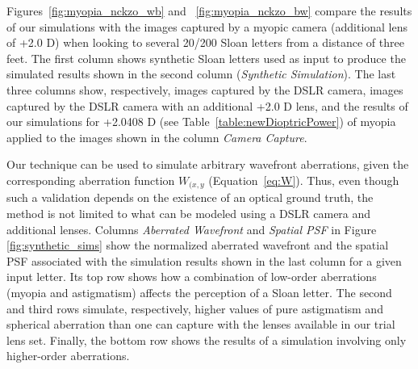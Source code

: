 Figures~\ref{fig:myopia_nckzo_wb} and ~\ref{fig:myopia_nckzo_bw} compare the results of our simulations with the images captured by a myopic camera (additional lens of +2.0 D) when looking to several 20/200 Sloan letters from a distance of three feet. 
The first column shows synthetic Sloan letters used as input to produce the simulated results shown in the second column ({\it Synthetic Simulation}). 
The last three columns show, respectively, images captured by the DSLR camera, images captured by the DSLR camera with an additional +2.0 D lens, and the results of our simulations for +2.0408 D (see Table~\ref{table:newDioptricPower}) of myopia applied to the images shown in the column {\it Camera Capture}.
%



Our technique can be used to simulate arbitrary wavefront aberrations, given the corresponding aberration function $W_{(x,y}$ (Equation~\ref{eq:W}). Thus, even though such a validation depends on the existence of an optical ground truth, the method is not limited to what can be modeled using a DSLR camera and additional lenses.
Columns {\it Aberrated Wavefront} and {\it Spatial PSF} in Figure \ref{fig:synthetic_sims} show the normalized aberrated wavefront and the spatial PSF associated with the simulation results shown in the last column for a given input letter. 
Its top row shows how a combination of low-order aberrations (myopia and astigmatism) affects the perception of a Sloan letter. 
The second and third rows simulate, respectively, higher values of pure astigmatism and spherical aberration than one can capture with the lenses available in our trial lens set. Finally, the bottom row shows the results of a simulation involving only higher-order aberrations. 


%

